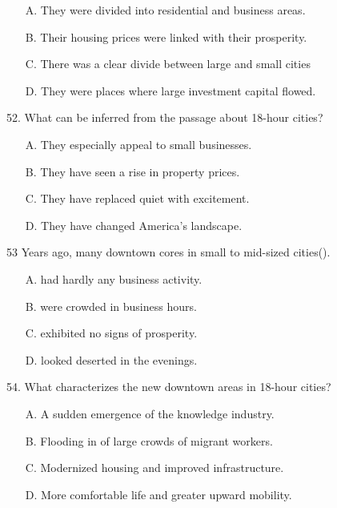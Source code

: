 \documentclass[UTF8,11pt]{ctexart}
\begin{document}
\begin{itemize}[leftmargin=2em,itemsep=.2em,topsep=.4em]\item[A.] They were divided into residential and business areas.
\item[B.] Their housing prices were linked with their prosperity.
\item[C.] There was a clear divide between large and small cities
\item[D.] They were places where large investment capital flowed.
\end{itemize}

52. What can be inferred from the passage about 18-hour cities?


\begin{itemize}[leftmargin=2em,itemsep=.2em,topsep=.4em]\item[A.] They especially appeal to small businesses.
\end{itemize}

\begin{itemize}[leftmargin=2em,itemsep=.2em,topsep=.4em]\item[B.] They have seen a rise in property prices.
\item[C.] They have replaced quiet with excitement.
\item[D.] They have changed America's landscape.
\end{itemize}

53 Years ago, many downtown cores in small to mid-sized cities().


\begin{itemize}[leftmargin=2em,itemsep=.2em,topsep=.4em]\item[A.] had hardly any business activity.
\item[B.] were crowded in business hours.
\item[C.] exhibited no signs of prosperity.
\item[D.] looked deserted in the evenings.
\end{itemize}

54. What characterizes the new downtown areas in 18-hour cities?


\begin{itemize}[leftmargin=2em,itemsep=.2em,topsep=.4em]\item[A.] A sudden emergence of the knowledge industry.
\item[B.] Flooding in of large crowds of migrant workers.
\item[C.] Modernized housing and improved infrastructure.
\item[D.] More comfortable life and greater upward mobility.
\end{itemize}
\end{document}
